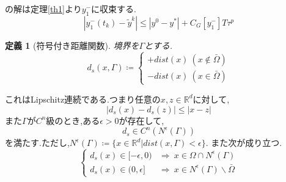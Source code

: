 \documentclass[a4,12pt]{article}
\newtheorem{dfn}{定義}
\begin{document}
の解は定理\ref{th1}より$y^-_1$に収束する.
\[
    |y^-_1(t_k)-\tilde{y}^k|\le |y^0-y^\ast|+C_G[y^-_1]T\tau^p
\]
\begin{dfn}[符号付き距離関数]
境界を$\Gamma$とする.\[
d_s(x,\Gamma)\coloneqq
\begin{cases}
+dist(x)\ (x\notin\bar{\Omega})\\
-dist(x)\ (x\in\bar{\Omega})
\end{cases}
\]\end{dfn}
これはLipschitz連続である.つまり任意の$x,z\in\mathbb{R}^d$に対して,
\begin{equation}
    |d_s(x)-d_s(z)|\le|x-z|
\end{equation}
また$\Gamma$が$C^n$級のとき,ある$\epsilon>0$が存在して,
\begin{equation}
d_s\in C^n(N^\epsilon (\Gamma))
\end{equation}
を満たす.ただし,$N^\epsilon(\Gamma)\coloneqq\{x\in\mathbb{R}^d|dist(x,\Gamma)<\epsilon\}$.
また次が成り立つ.
\begin{equation}\begin{cases}
    d_s(x)\in[-\epsilon,0)&\Rightarrow\ x\in\Omega\cap N^\epsilon(\Gamma)\\
    d_s(x)\in(0,\epsilon]&\Rightarrow\ x\in N^\epsilon(\Gamma)\backslash \bar{\Omega}
\end{cases}\end{equation}
\end{document}
